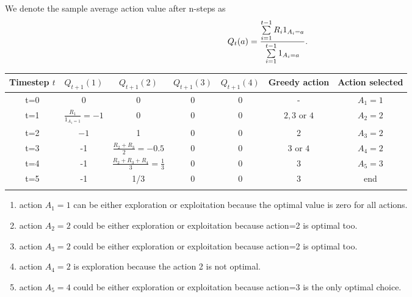 \documentclass[answers]{exam}
\theoremstyle{definition}
\theoremstyle{remark}
\newcommand{\tor}{\text{ or }}
\begin{document}
\begin{solution}


We denote the sample average action value after n-steps as
\begin{equation}
\Large{Q_t}(a) = \frac{{\sum\limits_{i = 1}^{t - 1} {{R_i}{1_{{A_i} = a}}} }}{{\sum\limits_{i = 1}^{t - 1} {{1_{{A_i} = a}}} }}.
\end{equation}

\begin{tabularx}{\linewidth}{ccccccc}
Timestep $t$ & $Q_{t+1}(1)$ & $Q_{t+1}(2)$    & $Q_{t+1}(3)$  & $Q_{t+1}(4)$ & Greedy action & Action selected\\
\hline 
t=0&0&0&0&0&-&$A_{1}=1$\\
\hline 
t=1&$\scriptstyle\frac{R_{1}}{1_{{A_1} = 1}}=-1$  & 0 &0&0&$2,3\tor 4$&$A_{2}=2$\\
\hline 
t=2& $-1$ &1&0&0&2&$A_{3}=2$\\
\hline 
t=3& -1& $\scriptstyle\frac{R_{2}+R_{3}}{2}=-0.5$ &0&0&$3\tor 4$&$A_{4}=2$\\
\hline 
t=4& -1 &$\scriptstyle\frac{R_{2}+R_{3}+R_{4}}{3}=\frac{1}{3}$&0  &0&3&$A_{5}=3$\\
\hline 
t=5&-1&1/3&0&0&3&end\\
\hline\\
\end{tabularx}

\begin{enumerate}
    \item action $A_{1}=1$ can be either exploration or exploitation because the optimal value is zero for all actions.

    \item action $A_{2}=2$ could be either exploration or exploitation because action=2 is optimal too.

    \item action $A_{3}=2$ could be either exploration or exploitation because action=2 is optimal too.

\item action $A_{4}=2$ is exploration because the action 2 is not optimal.

\item action $A_{5}=4$ could be either exploration or exploitation because action=$3$ is the only optimal choice.
    
\end{enumerate}






\end{solution}
\end{document}
